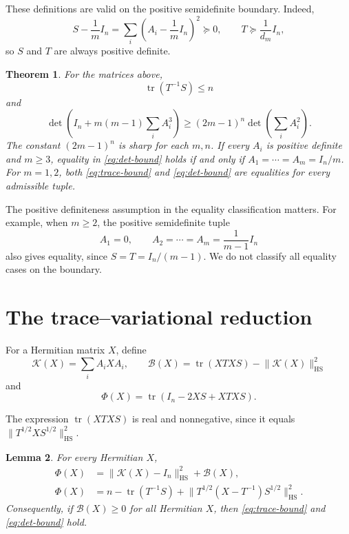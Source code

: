 \documentclass[11pt]{article}
\newtheorem{theorem}{Theorem}[section]
\newtheorem{lemma}[theorem]{Lemma}
\newcommand{\tr}{\operatorname{tr}}
\newcommand{\HS}{\mathrm{HS}}
\newcommand{\Id}{I_n}
\newcommand{\cK}{\mathcal K}
\newcommand{\cB}{\mathcal B}
\newcommand{\nrm}[1]{\lVert #1\rVert}
\begin{document}
These definitions are valid on the positive semidefinite boundary.
Indeed,
\begin{equation}\label{eq:positive-ST}
 S-\frac1m\Id=\sum_i\left(A_i-\frac1m\Id\right)^2\succeq0,
 \qquad T\succeq\frac1{d_m}\Id,
\end{equation}
so \(S\) and \(T\) are always positive definite.

\begin{theorem}\label{thm:main}
For the matrices above,
\begin{equation}\label{eq:trace-bound}
 \tr(T^{-1}S)\le n
\end{equation}
and
\begin{equation}\label{eq:det-bound}
 \det\!\left(\Id+m(m-1)\sum_i A_i^3\right)
 \ge(2m-1)^n\det\!\left(\sum_i A_i^2\right).
\end{equation}
The constant \((2m-1)^n\) is sharp for each \(m,n\).
If every \(A_i\) is positive definite and \(m\ge3\), equality in
\eqref{eq:det-bound} holds if and only if
\(A_1=\cdots=A_m=\Id/m\).
For \(m=1,2\), both \eqref{eq:trace-bound} and
\eqref{eq:det-bound} are equalities for every admissible tuple.
\end{theorem}

The positive definiteness assumption in the equality classification
matters. For example, when \(m\ge2\), the positive semidefinite tuple
\[
 A_1=0,\qquad A_2=\cdots=A_m=\frac1{m-1}\Id
\]
also gives equality, since \(S=T=\Id/(m-1)\).
We do not classify all equality cases on the boundary.

\section{The trace--variational reduction}

For a Hermitian matrix \(X\), define
\begin{equation}\label{eq:KB}
 \cK(X)=\sum_i A_iXA_i,\qquad
 \cB(X)=\tr(XTXS)-\nrm{\cK(X)}_{\HS}^2
\end{equation}
and
\begin{equation}\label{eq:Phi}
 \Phi(X)=\tr(\Id-2XS+XTXS).
\end{equation}

The expression \(\tr(XTXS)\) is real and nonnegative, since it equals
\(\nrm{T^{1/2}XS^{1/2}}_{\HS}^2\).

\begin{lemma}\label{lem:reduction}
For every Hermitian \(X\),
\begin{align}
 \Phi(X)&=\nrm{\cK(X)-\Id}_{\HS}^2+\cB(X),
 \label{eq:Phi-K}\\
 \Phi(X)&=n-\tr(T^{-1}S)
 +\nrm{T^{1/2}(X-T^{-1})S^{1/2}}_{\HS}^2.
 \label{eq:Phi-square}
\end{align}
Consequently, if \(\cB(X)\ge0\) for all Hermitian \(X\), then
\eqref{eq:trace-bound} and \eqref{eq:det-bound} hold.
\end{lemma}
\end{document}
